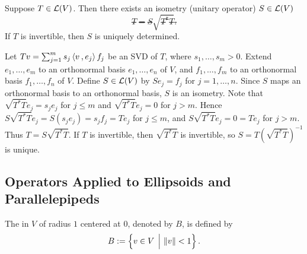 \begin{thm}
  \label{thm: polar decomposition}
  Suppose $T\in \mathcal{L}(V)$. Then there exists an isometry (unitary operator) $S\in \mathcal{L}(V)$ \st
  \begin{equation}
    T = S\sqrt{T^*T}.
  \end{equation}
  If $T$ is invertible, then $S$ is uniquely determined.
\end{thm}
\begin{prf}
  Let $Tv = \sum_{j=1}^m s_j \ip{v}{e_j} f_j$ be an SVD of $T$, where $s_1, \dots, s_m > 0$.
  Extend $e_1, \dots, e_m$ to an orthonormal basis $e_1, \dots, e_n$ of $V$, and $f_1, \dots, f_m$ to an orthonormal basis $f_1, \dots, f_n$ of $V$.
  Define $S \in \mathcal{L}(V)$ by $Se_j = f_j$ for $j = 1, \dots, n$. Since $S$ maps an orthonormal basis to an orthonormal basis, $S$ is an isometry.
  Note that $\sqrt{T^*T} e_j = s_j e_j$ for $j \leq m$ and $\sqrt{T^*T}e_j = 0$ for $j > m$.
  Hence $S\sqrt{T^*T} e_j = S(s_j e_j) = s_j f_j = Te_j$ for $j \leq m$, and $S\sqrt{T^*T}e_j = 0 = Te_j$ for $j > m$.
  Thus $T = S\sqrt{T^*T}$.
  If $T$ is invertible, then $\sqrt{T^*T}$ is invertible, so $S = T(\sqrt{T^*T})^{-1}$ is unique.
\end{prf}

\subsection{Operators Applied to Ellipsoids and Parallelepipeds}
\begin{mydef}[ball, $B$]
  The  in $V$ of radius $1$ centered at $0$, denoted by $B$, is defined by
  \begin{equation}
    B := \left\{v \in V \; \,\Big\vert\, \left \lVert v \right \rVert < 1  \right\}.
  \end{equation}
\end{mydef}